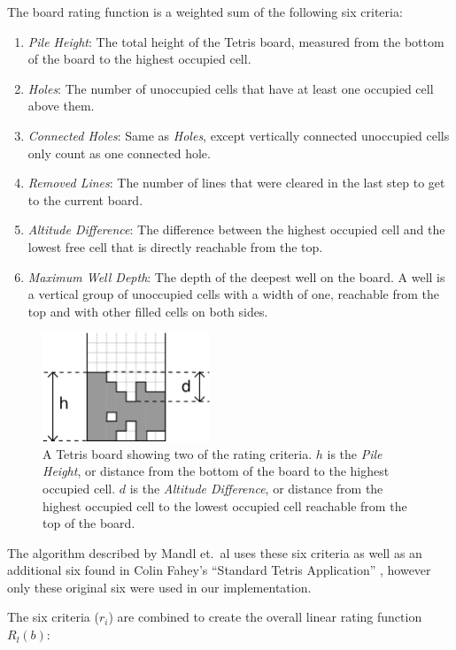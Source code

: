 \documentclass[a4paper,12pt]{article}
\begin{document}
The board rating function is a weighted sum of the following six criteria:

\begin{enumerate}
  \item \emph{Pile Height}: The total height of the Tetris board, measured from
      the bottom of the board to the highest occupied cell.
  \item \emph{Holes}: The number of unoccupied cells that have at least one
      occupied cell above them.
  \item \emph{Connected Holes}: Same as \emph{Holes}, except vertically
      connected unoccupied cells only count as one connected hole.
  \item \emph{Removed Lines}: The number of lines that were cleared in the last
      step to get to the current board.
  \item \emph{Altitude Difference}: The difference between the highest occupied
      cell and the lowest free cell that is directly reachable from the top.
  \item \emph{Maximum Well Depth}: The depth of the deepest well on the board.
      A well is a vertical group of unoccupied cells with a width of one,
      reachable from the top and with other filled cells on both sides.
\end{enumerate}

\begin{figure}[hb]
  \centering
  \includegraphics[width=5cm]{boards1.png}
  \caption{A Tetris board showing two of the rating criteria.  $h$ is
      the \emph{Pile Height}, or distance from the bottom of the board to
      the highest occupied cell.  $d$ is the \emph{Altitude Difference}, or
      distance from the highest occupied cell to the lowest occupied cell
      reachable from the top of the board.}
  \label{BoardRating}
\end{figure}

The algorithm described by Mandl et.\ al uses these six criteria as well as
an additional six found in Colin Fahey's ``Standard Tetris Application''
\cite{TetrisAI}, however only these original six were used in our
implementation.

The six criteria ($r_i$) are combined to create the overall linear rating
function $R_l(b)$:
\end{document}
